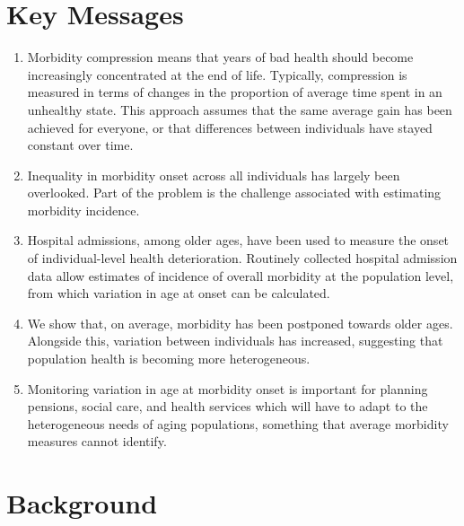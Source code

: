 \newpage




\section{Key Messages}

\begin{enumerate}
	\item	Morbidity compression means that years of bad health should become 
			increasingly concentrated at the end of life. Typically, compression 
			is measured in terms of changes in the proportion of average time 
			spent in an unhealthy state. This approach assumes that the same 
			average gain has been achieved for everyone, or that differences 
			between individuals have stayed constant over time.
	\item	Inequality in morbidity onset across all individuals has largely 
			been overlooked. Part of the problem is the challenge associated 
			with estimating morbidity incidence.
	\item	Hospital admissions, among older ages, have been used to measure 
			the onset of individual-level health deterioration. Routinely 
			collected hospital admission data allow estimates of incidence 
			of overall morbidity at the population level, from which variation 
			in age at onset can be calculated.
	\item	We show that, on average, morbidity has been postponed towards 
			older ages. Alongside this, variation between individuals has 
			increased, suggesting that population health is becoming more 
			heterogeneous. 
	\item	Monitoring variation in age at morbidity onset is important for 
			planning pensions, social care, and health services which will 
			have to adapt to the heterogeneous needs of aging populations, 
			something that average morbidity measures cannot identify.
\end{enumerate}


\newpage




\section{Background}


